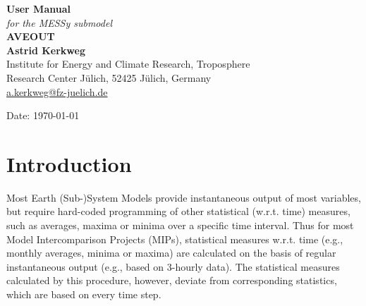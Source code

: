 \documentclass[twoside]{article}
\begin{document}
\thispagestyle{empty}
\vspace*{2.5cm}
\begin{center}
  {\Huge\bf User Manual}\\[3mm]
  {\huge\it for the MESSy submodel}\\[3mm]
   {\Huge\bf AVEOUT}\\[27mm]
  {\huge\bf Astrid Kerkweg}\\[9mm]
  \normalsize
  Institute for Energy and Climate Research, Troposphere\\ Research Center
  J\"ulich, 52425 J\"ulich, Germany\\
  \url{a.kerkweg@fz-juelich.de}\\[3mm]
\end{center}

\vspace{4cm}
\tableofcontents
\vspace{2cm}

\begin{center}
  Date: \today
\end{center}


\newpage%
\sloppy

\section{Introduction}
\label{sec:intro}
%
Most Earth (Sub-)System Models provide instantaneous output of most variables,
but require hard-coded programming of other statistical (w.r.t. time)
measures, such as averages, maxima or minima over a specific time interval.
Thus for most Model Intercomparison Projects (MIPs), statistical measures
w.r.t. time (e.g., monthly averages, minima or maxima) are calculated on the
basis of regular instantaneous output (e.g., based on 3-hourly data).  The
statistical measures calculated by this procedure, however, deviate from
corresponding statistics, which are based on every time step.
\end{document}
